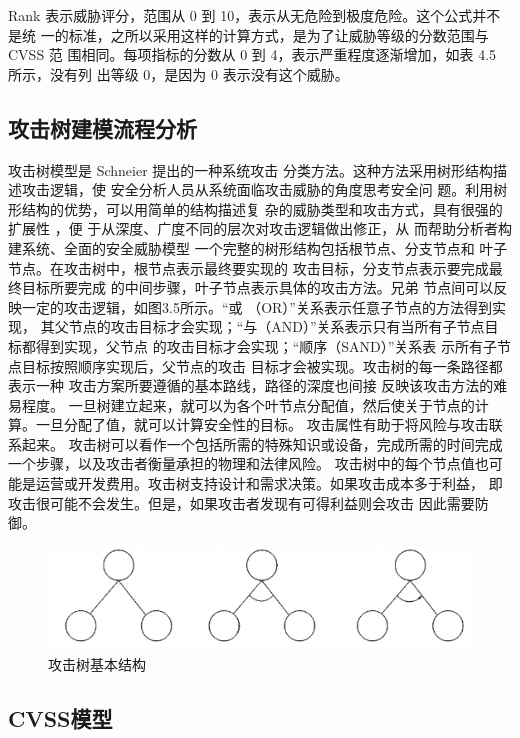 Rank 表示威胁评分，范围从 0 到 10，表示从无危险到极度危险。这个公式并不是统
一的标准，之所以采用这样的计算方式，是为了让威胁等级的分数范围与 CVSS 范
围相同。每项指标的分数从 0 到 4，表示严重程度逐渐增加，如表 4.5 所示，没有列
出等级 0，是因为 0 表示没有这个威胁。

\subsection[]{攻击树建模流程分析}

攻击树模型是 Schneier\cite{schneier1999attack} 提出的一种系统攻击
分类方法。这种方法采用树形结构描述攻击逻辑，使
安全分析人员从系统面临攻击威胁的角度思考安全问
题。利用树形结构的优势，可以用简单的结构描述复
杂的威胁类型和攻击方式，具有很强的扩展性 \cite{tuozhan}
，便
于从深度、广度不同的层次对攻击逻辑做出修正，从
而帮助分析者构建系统、全面的安全威胁模型
一个完整的树形结构包括根节点、分支节点和
叶子节点。在攻击树中，根节点表示最终要实现的
攻击目标，分支节点表示要完成最终目标所要完成
的中间步骤，叶子节点表示具体的攻击方法。兄弟
节点间可以反映一定的攻击逻辑，如图3.5所示。“或
（OR）”关系表示任意子节点的方法得到实现，
其父节点的攻击目标才会实现；“与（AND）”关系表示只有当所有子节点目标都得到实现，父节点
的攻击目标才会实现；“顺序（SAND）”关系表
示所有子节点目标按照顺序实现后，父节点的攻击
目标才会被实现。攻击树的每一条路径都表示一种
攻击方案所要遵循的基本路线，路径的深度也间接
反映该攻击方法的难易程度。
一旦树建立起来，就可以为各个叶节点分配值，然后使关于节点的计算。一旦分配了值，就可以计算安全性的目标。
攻击属性有助于将风险与攻击联系起来。
攻击树可以看作一个包括所需的特殊知识或设备，完成所需的时间完成一个步骤，以及攻击者衡量承担的物理和法律风险。
攻击树中的每个节点值也可能是运营或开发费用。攻击树支持设计和需求决策。如果攻击成本多于利益，
即攻击很可能不会发生。但是，如果攻击者发现有可得利益则会攻击 因此需要防御。

\begin{figure}
    \centering
    \includegraphics[scale=0.6]{resources/img/i8.png}
    \caption{攻击树基本结构}
  \end{figure}

\subsection[]{CVSS模型}

